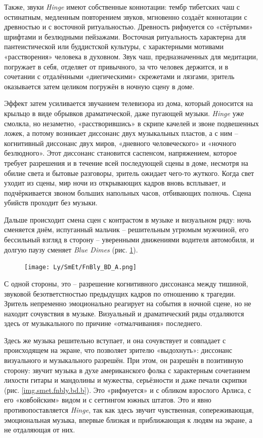 Также, звуки \emph{Hinge} имеют собственные коннотации: тембр тибетских чаш с остинатным, медленным повторением звуков, мгновенно создаёт коннотации с древностью и с восточной ритуальностью.
Древность рифмуется со «стёртыми» шрифтами и безлюдными пейзажами.
Восточная ритуальность характерна для пантеистической или буддистской культуры, с характерными мотивами «расстворения» человека в духовном.
Звук чаш, предназначенных для медитации, погружает в себя, отделяет от привычного, за что человек держится, и в сочетании с отдалёнными «диегическими» скрежетами и лязгами, зритель оказывается затем целиком погружён в ночную сцену в доме.

Эффект затем усиливается звучанием телевизора из дома, который доносится на крыльцо в виде обрывков драматической, даже пугающей музыки.
\emph{Hinge} уже смолкла, но незаметно, «расстворившись» в скрипе качелей и звоне подвешенных ложек, а потому возникает диссонанс двух музыкальных пластов, а с ним -- когнитивный диссонанс двух миров, «дневного человеческого» и «ночного безлюдного».
Этот диссонанс становится саспенсом, напряжением, которое требует разрешения и в течение всей последующей сцены в доме, несмотря на обилие света и бытовые разговоры, зритель ожидает чего-то жуткого.
Когда свет уходит из сцены, мир ночи из открывающих кадров вновь всплывает, и подчёркивается звоном больших напольных часов, отбивающих полночь.
Сцена убийств проходит без музыки.

Дальше происходит смена сцен с контрастом в музыке и визуальном ряду: ночь сменяется днём, испуганный мальчик -- решительным угрюмым мужчиной, его бессильный взгляд в сторону -- уверенными движениями водителя автомобиля, и долгую паузу сменяет \emph{Blue Dimes} (рис. \ref{img.smet.fnbly.bd.a}).

\begin{figure}
\centering
\texttt{[image: Ly/SmEt/FnBly\_BD\_A.png]}
\caption{}\label{img.smet.fnbly.bd.a}
\end{figure}

С одной стороны, это -- разрешение когнитивного диссонанса между тишиной, звуковой безответстностью предыдущих кадров по отношению к трагедии.
Зритель непременно эмоционально реагирует на события в ночной сцене, но не находит сочувствия в музыке.
Визуальный и драматический ряды отдаляются здесь от музыкального по причине «отмалчивания» последнего.

Здесь же музыка решительно вступает, и она сочувствует и совпадает с происходящем на экране, что позволяет зрителю «выдохнуть»: диссонанс визуального и музыкального разрешён.
При этом, он разрешён в позитивную сторону: звучит музыка в духе американского фолка с характерным сочетанием лихости гитары и мандолины и мужества, серьёзности и даже печали скрипки (рис. \ref{img.smet.fnbly.bd.b}).
Это «рифмуется» и с обликом взрослого Арлиса, с его «ковбойским» видом и с сеттингом южных штатов.
Это и явно противопоставляется \emph{Hinge}, так как здесь звучит чувственная, сопереживающая, эмоциональная музыка, впервые близкая и приближающая к людям на экране, а не отдаляющая от них.

